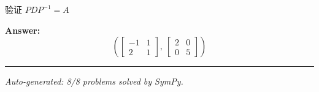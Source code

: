 \documentclass[12pt, a4paper]{article}
\begin{document}
验证 $PDP^{-1} = A$

\textbf{Answer:}
\[\boxed{\left( \left[\begin{matrix}-1 & 1\\2 & 1\end{matrix}\right], \  \left[\begin{matrix}2 & 0\\0 & 5\end{matrix}\right]\right)}\]

\vspace{1em}
\hrule
\vspace{1em}


\vspace{2em}
\noindent\textit{Auto-generated: 8/8 problems solved by SymPy.}
\end{document}
